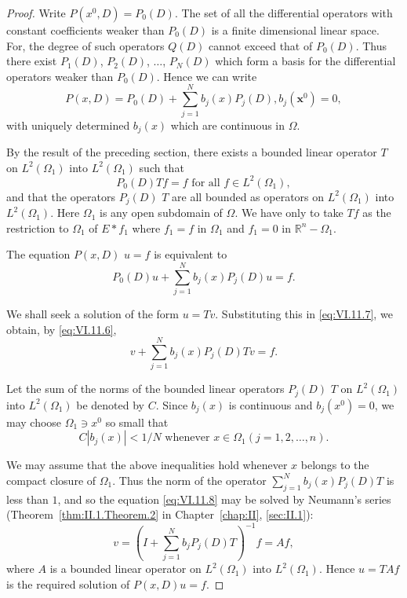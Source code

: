 \begin{proof}
 Write $P(x^{0}, D) = P_{0}(D)$. The set of all the differential operators with constant coefficients weaker than $P_{0}(D)$ is a finite dimensional linear space. For, the degree of such operators $Q(D)$ cannot exceed that of $P_{0}(D)$. Thus there exist $P_{1}(D)$, $P_{2}(D)$, $\ldots$, $P_{N}(D)$ which form a basis for the differential operators weaker than $P_{0}(D)$. Hence we can write 
\begin{equation}\label{eq:VI.11.5}
P (x, D) = P _{0} (D) + \sum\limits_{j=1} ^{N} b _{j} (x) P _{j} (D), b _{j} (\boldsymbol {x} ^{0}) = 0,
\end{equation}
with uniquely determined $b_{j}(x)$ which are continuous in $\Omega$. 


By the result of the preceding section, there exists a bounded linear operator $T$ on $L^2(\Omega_1)$ into $L^2(\Omega_1)$ such that 
\begin{equation}\label{eq:VI.11.6}
P _{0} (D) T f = f \text{ for all } f \in L ^{2} (\Omega_{1}),
\end{equation}
and that the operators $P_j(D)$ $T$ are all bounded as operators on $L^2(\Omega_1)$ into $L^2(\Omega_1)$. Here $\Omega_1$ is any open subdomain of $\Omega$. We have only to take $Tf$ as the restriction to $\Omega_1$ of $E * f_1$ where $f_1 = f$ in $\Omega_1$ and $f_1 = 0$ in $\mathbb{R}^{n} - \Omega_1$. 

The equation $P(x, D)$ $u = f$ is equivalent to 
\begin{equation}\label{eq:VI.11.7}
P _{0} (D) u + \sum\limits_{j=1} ^{N} b _{j} (x) P _{j} (D) u = f.
\end{equation}

We shall seek a solution of the form $u = Tv$. Substituting this in \eqref{eq:VI.11.7}, we obtain, by \eqref{eq:VI.11.6}, 
\begin{equation}\label{eq:VI.11.8}
v + \sum\limits_{j=1} ^{N} b _{j} (x) P _{j} (D) T v = f.
\end{equation}

Let the sum of the norms of the bounded linear operators $P_{j}(D)$ $T$ on $L^{2}(\Omega_{1})$ into $L^{2}(\Omega_{1})$ be denoted by $C$. Since $b_{j}(x)$ is continuous and $b_{j}(x^{0}) = 0$, we may choose $\Omega_{1} \ni x^{0}$ so small that 
\[
C \left| b _{j} (x) \right| < 1 / N \text{ whenever } x \in \Omega_{1} (j = 1, 2, \dots , n).
\]

We may assume that the above inequalities hold whenever $x$ belongs to the compact closure of $\Omega_1$. Thus the norm of the operator $\sum\limits_{j=1}^{N} b_j(x) P_j(D) T$ is less than $1$, and so the equation \eqref{eq:VI.11.8} may be solved by Neumann's series (Theorem~\ref{thm:II.1.Theorem.2} in Chapter~\ref{chap:II}, \ref{sec:II.1}): 
\[
v = \left(I + \sum\limits_{j=1} ^{N} b _{j} P _{j} (D) T\right) ^{-1} f = A f,
\]
where $A$ is a bounded linear operator on $L^2(\Omega_1)$ into $L^2(\Omega_1)$. Hence $u = TAf$ is the required solution of $P(x, D)u = f$.
\end{proof}

